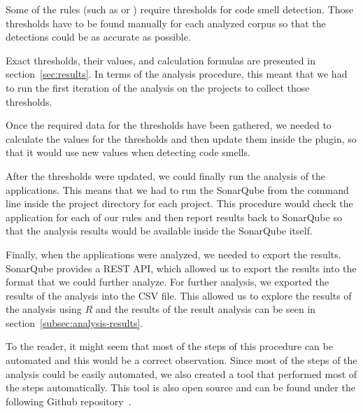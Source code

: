 Some of the rules (such as  or ) require thresholds for code smell detection.
Those thresholds have to be found manually for each analyzed corpus so that the detections could be as accurate
as possible.

Exact thresholds, their values, and calculation formulas are presented in section~\ref{sec:results}.
In terms of the analysis procedure, this meant that we had to run the first iteration of the analysis
on the projects to collect those thresholds.

Once the required data for the thresholds have been gathered, we needed to calculate the values
for the thresholds and then update them inside the plugin, so that it would use new values
when detecting code smells.

After the thresholds were updated, we could finally run the analysis of the applications.
This means that we had to run the SonarQube from the command line inside the project directory for each project.
This procedure would check the application for each of our rules and then report results back to SonarQube so that
the analysis results would be available inside the SonarQube itself.

Finally, when the applications were analyzed, we needed to export the results.
SonarQube provides a REST API, which allowed us to export the results into the format that
we could further analyze.
For further analysis, we exported the results of the analysis into the CSV file.
This allowed us to explore the results of the analysis using $R$ and the results of the result analysis
can be seen in section~\ref{subsec:analysis-results}.

To the reader, it might seem that most of the steps of this procedure can be automated and this would be a correct
observation.
Since most of the steps of the analysis could be easily automated, we also created a tool that performed
most of the steps automatically.
This tool is also open source and can be found under the following Github repository~\cite{bulk_analyzer}.
